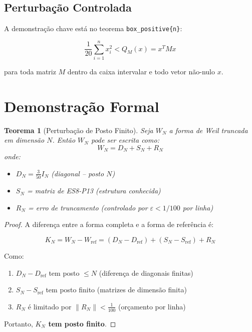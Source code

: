 \documentclass[12pt,a4paper]{article}
\theoremstyle{plain}
\newtheorem{teorema}{Teorema}
\theoremstyle{definition}
\theoremstyle{remark}
\begin{document}
\subsection{Perturbação Controlada}

A demonstração chave está no teorema \texttt{box\_positive\{n\}}:

\begin{equation}
\frac{1}{20}\sum_{i=1}^{n} x_i^2 < Q_M(x) = x^T M x
\end{equation}

para toda matriz $M$ dentro da caixa intervalar e todo vetor não-nulo $x$.

\section{Demonstração Formal}

\begin{teorema}[Perturbação de Posto Finito]
Seja $W_N$ a forma de Weil truncada em dimensão $N$. Então $W_N$ pode ser escrita como:
\begin{equation}
W_N = D_N + S_N + R_N
\end{equation}
onde:
\begin{itemize}
    \item $D_N = \frac{3}{50}I_N$ (diagonal -- posto $N$)
    \item $S_N$ = matriz de ES8-P13 (estrutura conhecida)
    \item $R_N$ = erro de truncamento (controlado por $\varepsilon < 1/100$ por linha)
\end{itemize}
\end{teorema}

\begin{proof}
A diferença entre a forma completa e a forma de referência é:

\begin{equation}
K_N = W_N - W_{\text{ref}} = (D_N - D_{\text{ref}}) + (S_N - S_{\text{ref}}) + R_N
\end{equation}

Como:
\begin{enumerate}
    \item $D_N - D_{\text{ref}}$ tem posto $\leq N$ (diferença de diagonais finitas)
    \item $S_N - S_{\text{ref}}$ tem posto finito (matrizes de dimensão finita)
    \item $R_N$ é limitado por $\|R_N\| < \frac{1}{100}$ (orçamento por linha)
\end{enumerate}

Portanto, \textbf{$K_N$ tem posto finito}.
\end{proof}
\end{document}
